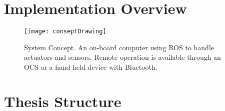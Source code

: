 \section{Implementation Overview}

\begin{figure}[p]
	\centering
	\texttt{[image: conseptDrawing]}
	\caption{System Concept. An on-board computer using \ac{ROS} to handle actuators and sensors. Remote operation is available through an \ac{OCS} or a hand-held device with Bluetooth.}
	\label{fig:conseptDrawing}
\end{figure}

\section{Thesis Structure}
